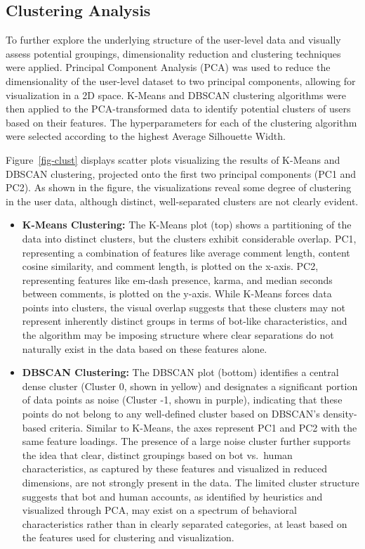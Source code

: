 \documentclass[
  12pt,
  letterpaper,
  DIV=11,
  numbers=noendperiod]{scrartcl}
\begin{document}
\subsection{Clustering Analysis}\label{clustering-analysis}

To further explore the underlying structure of the user-level data and
visually assess potential groupings, dimensionality reduction and
clustering techniques were applied. Principal Component Analysis (PCA)
was used to reduce the dimensionality of the user-level dataset to two
principal components, allowing for visualization in a 2D space. K-Means
and DBSCAN clustering algorithms were then applied to the
PCA-transformed data to identify potential clusters of users based on
their features. The hyperparameters for each of the clustering algorithm
were selected according to the highest Average Silhouette Width.

Figure~\ref{fig-clust} displays scatter plots visualizing the results of
K-Means and DBSCAN clustering, projected onto the first two principal
components (PC1 and PC2). As shown in the figure, the visualizations
reveal some degree of clustering in the user data, although distinct,
well-separated clusters are not clearly evident.

\begin{itemize}
\item
  \textbf{K-Means Clustering:} The K-Means plot (top) shows a
  partitioning of the data into distinct clusters, but the clusters
  exhibit considerable overlap. PC1, representing a combination of
  features like average comment length, content cosine similarity, and
  comment length, is plotted on the x-axis. PC2, representing features
  like em-dash presence, karma, and median seconds between comments, is
  plotted on the y-axis. While K-Means forces data points into clusters,
  the visual overlap suggests that these clusters may not represent
  inherently distinct groups in terms of bot-like characteristics, and
  the algorithm may be imposing structure where clear separations do not
  naturally exist in the data based on these features alone.
\item
  \textbf{DBSCAN Clustering:} The DBSCAN plot (bottom) identifies a
  central dense cluster (Cluster 0, shown in yellow) and designates a
  significant portion of data points as noise (Cluster -1, shown in
  purple), indicating that these points do not belong to any
  well-defined cluster based on DBSCAN's density-based criteria. Similar
  to K-Means, the axes represent PC1 and PC2 with the same feature
  loadings. The presence of a large noise cluster further supports the
  idea that clear, distinct groupings based on bot vs.~human
  characteristics, as captured by these features and visualized in
  reduced dimensions, are not strongly present in the data. The limited
  cluster structure suggests that bot and human accounts, as identified
  by heuristics and visualized through PCA, may exist on a spectrum of
  behavioral characteristics rather than in clearly separated
  categories, at least based on the features used for clustering and
  visualization.
\end{itemize}
\end{document}
